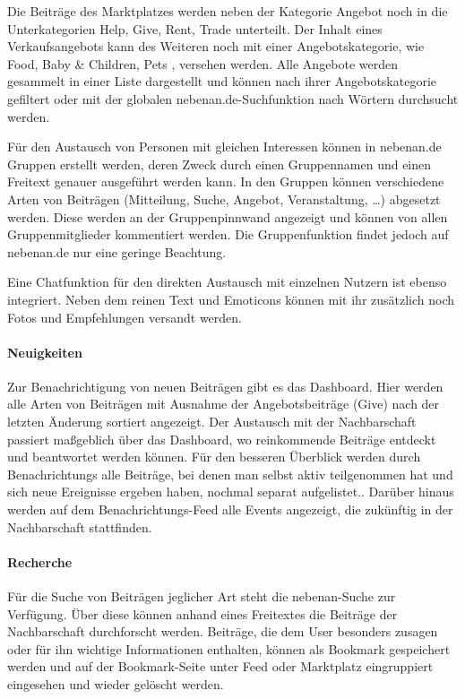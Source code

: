 Die Beiträge des Marktplatzes werden neben der Kategorie Angebot noch in die Unterkategorien Help, Give, Rent, Trade \usw unterteilt. Der Inhalt eines Verkaufsangebots kann des Weiteren noch mit einer Angebotskategorie, wie Food, Baby \& Children, Pets \usw, versehen werden. Alle Angebote werden gesammelt in einer Liste dargestellt und können nach ihrer Angebotskategorie gefiltert oder mit der globalen nebenan.de-Suchfunktion nach Wörtern durchsucht werden.

Für den Austausch von Personen mit gleichen Interessen können in nebenan.de Gruppen erstellt werden, deren Zweck durch einen Gruppennamen und einen Freitext genauer ausgeführt werden kann. In den Gruppen können verschiedene Arten von Beiträgen (Mitteilung, Suche, Angebot, Veranstaltung, \ldots) abgesetzt werden. Diese werden an der Gruppenpinnwand angezeigt und können von allen Gruppenmitglieder kommentiert werden. Die Gruppenfunktion findet jedoch auf nebenan.de nur eine geringe Beachtung.

Eine Chatfunktion für den direkten Austausch mit einzelnen Nutzern ist ebenso integriert. Neben dem reinen Text und Emoticons können mit ihr zusätzlich noch Fotos und Empfehlungen versandt werden.

\paragraph{Neuigkeiten}

Zur Benachrichtigung von neuen Beiträgen gibt es das Dashboard. Hier werden alle Arten von Beiträgen mit Ausnahme der Angebotsbeiträge (Give) nach der letzten Änderung sortiert angezeigt. Der Austausch mit der Nachbarschaft passiert maßgeblich über das Dashboard, wo reinkommende Beiträge entdeckt und beantwortet werden können.
Für den besseren Überblick werden durch Benachrichtungs alle Beiträge, bei denen man selbst aktiv teilgenommen hat und sich neue Ereignisse ergeben haben, nochmal separat aufgelistet.. Darüber hinaus werden auf dem Benachrichtungs-Feed alle Events angezeigt, die zukünftig in der Nachbarschaft stattfinden.

\paragraph{Recherche}

Für die Suche von Beiträgen jeglicher Art steht die nebenan-Suche zur Verfügung. Über diese können anhand eines Freitextes die Beiträge der Nachbarschaft durchforscht werden.
Beiträge, die dem User besonders zusagen oder für ihn wichtige Informationen enthalten, können als Bookmark gespeichert werden und auf der Bookmark-Seite unter Feed oder Marktplatz eingruppiert eingesehen und wieder gelöscht werden.

